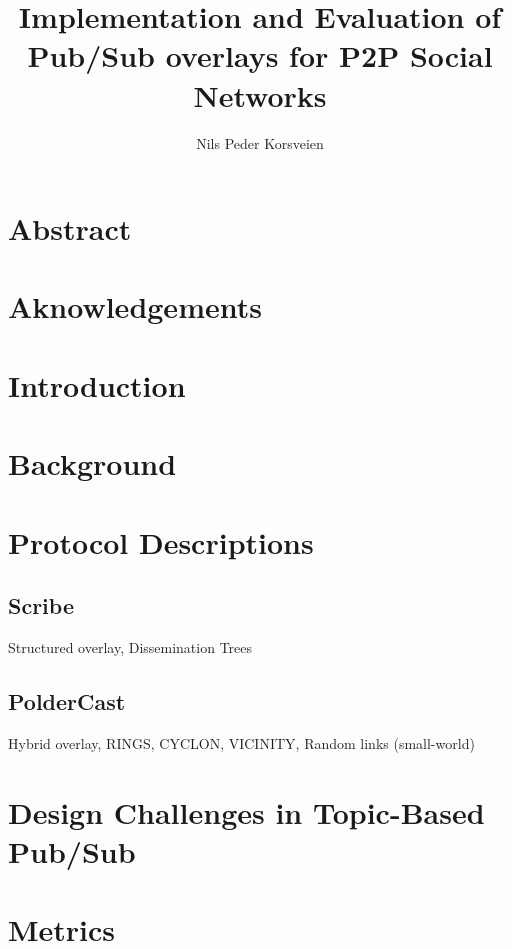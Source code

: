 \documentclass[UKenglish, a4paper]{ifimaster}
\title{Implementation and Evaluation of Pub/Sub overlays for P2P Social Networks}
\subtitle{}
\author{Nils Peder Korsveien}
\begin{document}
\ififorside{}
\frontmatter{}
\maketitle{}

\chapter*{Abstract}
\tableofcontents{}
\listoffigures{}
\listoftables{}
\chapter*{Aknowledgements}
\mainmatter{}

\chapter{Introduction}


\chapter{Background}
\label{ch:background}


\chapter{Protocol Descriptions}
\label{ch:protocol-descriptions}
\section{Scribe}
Structured overlay, Dissemination Trees
\section{PolderCast}
Hybrid overlay, RINGS, CYCLON, VICINITY, Random links (small-world)

\chapter{Design Challenges in Topic-Based Pub/Sub}
\label{ch:desired-system-properties-and-trade-offs}


\chapter{Metrics}
\label{ch:metrics}

\end{document}
